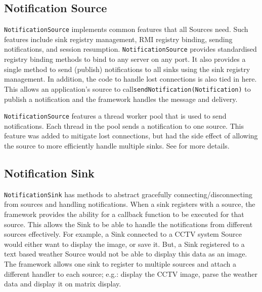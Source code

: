 \documentclass[a4paper]{article}
\begin{document}
\subsection{Notification Source}
\texttt{NotificationSource} implements common features that all Sources need.
Such features include sink registry management, RMI registry binding, sending notifications, and session resumption.
\texttt{NotificationSource} provides standardised registry binding methods to bind to any server on any port.
It also provides a single method to send (publish) notifications to all sinks using the sink registry management.
In addition, the code to handle lost connections is also tied in here.
This allows an application's source to call\texttt{sendNotification(Notification)} to publish a notification and the framework handles the message and delivery.

\texttt{NotificationSource} features a thread worker pool that is used to send notifications.
Each thread in the pool sends a notification to one source.
This feature was added to mitigate lost connections, but had the side effect of allowing the source to more efficiently handle multiple sinks.
See  for more details.

\subsection{Notification Sink}
\texttt{NotificationSink} has methods to abstract gracefully connecting/disconnecting from sources and handling notifications.
When a sink registers with a source, the framework provides the ability for a callback function to be executed for that source.
This allows the Sink to be able to handle the notifications from different sources effectively.
For example, a Sink connected to a CCTV system Source would either want to display the image, or save it.
But, a Sink registered to a text based weather Source would not be able to display this data as an image.
The framework allows one sink to register to multiple sources and attach a different handler to each source;
e.g.: display the CCTV image, parse the weather data and display it on matrix display.

\end{document}
